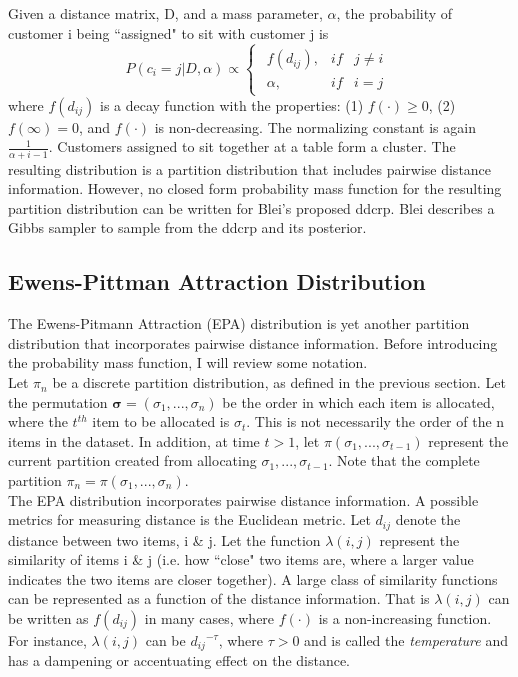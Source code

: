 \noindent
Given a distance matrix, D, and a mass parameter, $\alpha$, the probability
of customer i being ``assigned" to sit with customer j is 
\begin{equation}
  P(c_i=j|D,\alpha) \propto 
  \begin{cases}
    \begin{array}{rll}
      f(d_{ij}), & if & j \ne i\\
      \alpha,    & if & i=j
    \end{array}  
  \end{cases}
\end{equation}
where $f(d_{ij})$ is a decay function with the properties: (1) $f(\cdot) \ge 0$,
(2) $f(\infty) = 0$, and $f(\cdot)$ is non-decreasing. The normalizing constant 
is again $\frac{1}{\alpha+i-1}$. Customers assigned to sit together at a table
form a cluster. The resulting distribution is a partition distribution that
includes pairwise distance information. However, no closed form probability 
mass function for the resulting partition distribution can be written for 
Blei's proposed ddcrp. Blei describes a Gibbs sampler to sample from the 
ddcrp and its posterior.

\subsection{Ewens-Pittman Attraction Distribution}
The Ewens-Pitmann Attraction (EPA) distribution is yet another partition
distribution that incorporates pairwise distance information. Before 
introducing the probability mass function, I will review some notation.\\

\noindent
Let $\pi_n$ be a discrete partition distribution, as defined in the previous
section. Let the permutation $\bm \sigma = (\sigma_1,...,\sigma_n)$ be the order
in which each item is allocated, where the $t^{th}$ item to be allocated is
$\sigma_t$. This is not necessarily the order of the n items in the dataset. In
addition, at time $t > 1$, let $\pi(\sigma_{1},...,\sigma_{t-1})$ represent the
current partition created from allocating $\sigma_{1},...,\sigma_{t-1}$. Note
that the complete partition $\pi_n = \pi(\sigma_{1},...,\sigma_{n})$.\\

\noindent
The EPA distribution incorporates pairwise distance information. A possible
metrics for measuring distance is the Euclidean metric. Let $d_{ij}$ denote the
distance between two items, i \& j. Let the function $\lambda(i,j)$ represent
the similarity of items i \& j (i.e. how ``close" two items are, where a larger
value indicates the two items are closer together). A large class of similarity
functions can be represented as a function of the distance information. That is
$\lambda(i,j)$ can be written as $f(d_{ij})$ in many cases, where $f(\cdot)$ is a
non-increasing function. For instance, $\lambda(i,j)$ can be ${d_{ij}}^{-\tau}$,
where $\tau>0$ and is called the \textit{temperature} and has a dampening or
accentuating effect on the distance.\\

